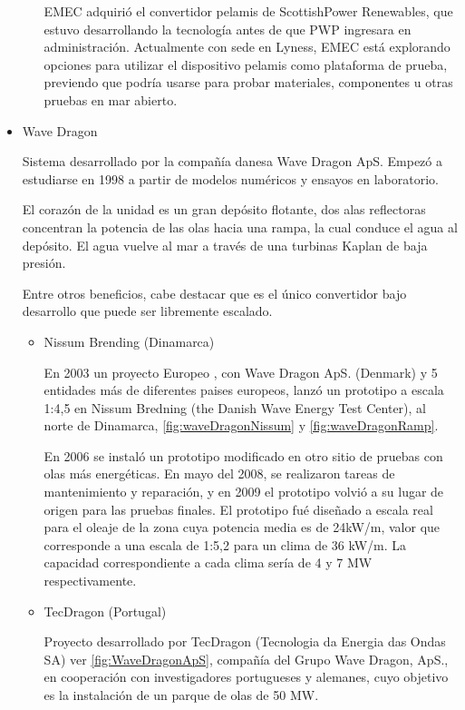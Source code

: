 \begin{itemize}
\begin{itemize}
    

    EMEC \cite{emec16} adquirió el convertidor pelamis de ScottishPower Renewables,
    que estuvo desarrollando la tecnología antes de que PWP ingresara en
    administración. Actualmente con sede en Lyness, EMEC está explorando
    opciones para utilizar el dispositivo pelamis como plataforma de
    prueba, previendo que podría usarse para probar materiales,
    componentes u otras pruebas en mar
    abierto.
  \end{itemize}
\item
  Wave Dragon

  Sistema desarrollado por la compañía danesa Wave Dragon ApS. Empezó a
  estudiarse en 1998 a partir de modelos numéricos y ensayos en
  laboratorio.

  El corazón de la unidad es un gran depósito flotante, dos alas
  reflectoras concentran la potencia de las olas hacia una rampa, la
  cual conduce el agua al depósito. El agua vuelve al mar a través de
  una turbinas Kaplan de baja presión.

  Entre otros beneficios, cabe destacar que es el único convertidor bajo
  desarrollo que puede ser libremente escalado.

  \begin{itemize}
  \item
    Nissum Brending (Dinamarca)

    En 2003 un proyecto
    Europeo \cite{wavedragon06}, con Wave Dragon ApS. (Denmark) y 5 entidades más de
    diferentes paises europeos, lanzó un prototipo a escala 1:4,5 en
    Nissum Bredning (the Danish Wave Energy Test Center), al norte de
    Dinamarca, \autoref{fig:waveDragonNissum} y \autoref{fig:waveDragonRamp}.

    En 2006 se instaló un prototipo modificado en otro sitio de pruebas
    con olas más energéticas. En mayo del 2008, se realizaron tareas de
    mantenimiento y reparación, y en 2009 el prototipo volvió a su lugar
    de origen para las pruebas finales. El prototipo fué diseñado a
    escala real para el oleaje de la zona cuya potencia media es de
    24kW/m, valor que corresponde a una escala de 1:5,2 para un clima de
    36 kW/m. La capacidad correspondiente a cada clima sería de 4 y 7 MW
    respectivamente.




  \item
    TecDragon (Portugal)

    Proyecto desarrollado por TecDragon (Tecnologia da Energia das Ondas
    SA) ver \autoref{fig:WaveDragonApS}, compañía del Grupo Wave Dragon, ApS., en cooperación con
    investigadores portugueses y alemanes, cuyo objetivo es la
    instalación de un parque de olas de 50 MW.


\end{itemize}
\end{itemize}
